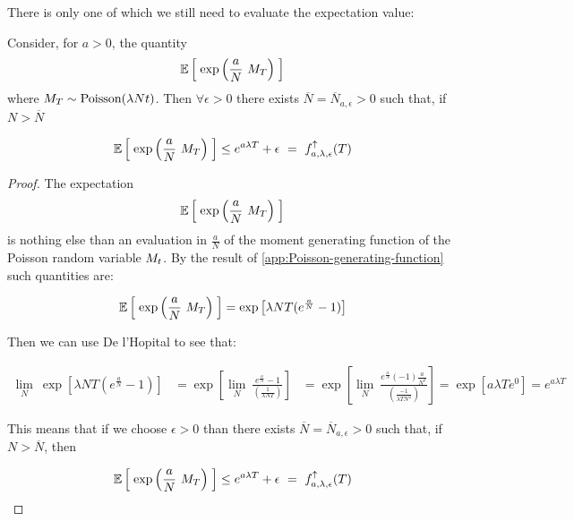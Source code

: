 There is only one \rv of which we still need to evaluate the expectation value:
	
\begin{lemma}\label{ch6:evaluate-moment-generating-func-in-lim-N}
	Consider, for $a>0$, the quantity
	\begin{equation*}
		\mathbb{E} \left[ \; 
			\exp \left(
			\frac{a}{N}\
			M_T
			\right) 
		 \; \right]
	\end{equation*}
	where $M_T \sim \text{Poisson}(\lambda N t)$.
	Then $\forall\epsilon > 0$ there exists $\overline{N}= \overline{N}_{a, \epsilon} >0$ such that, if $N > \overline{N}$
	
	\begin{equation*}
		\mathbb{E} \left[ \; 
			\exp \left(
			\frac{a}{N}\
			M_T
			\right)  \; \right] \leq e^{a\lambda T} + \epsilon\
			=\
			f^\uparrow_{a,\lambda,\epsilon}(T)
	\end{equation*}
\end{lemma}

\begin{proof}
	The expectation
	\begin{equation*}
		\mathbb{E} \left[ \; 
			\exp \left(
			\frac{a}{N}\
			M_T
			\right) 
		 \; \right]
	\end{equation*}
	is nothing else than an evaluation in $\frac{a}{N}$ of the moment generating function of the Poisson random variable $M_t$. 
	By the result of \ref{app:Poisson-generating-function} such quantities are:
	
	\begin{align*}
		\mathbb{E} \left[ \; 
			\exp \left(
			\frac{a}{N}\
			M_T
			\right)  \; \right]
		= \exp\left[\lambda N T (e^{\frac{a}{N}}-1)\right]
	\end{align*}
	
	Then we can use De l'Hopital to see that:
	
	\begin{align*}
		\lim_N\
		\exp\left[\lambda N T (e^{\frac{a}{N}}-1)\right]
		&=
		\exp\left[
		\lim_N\
		\frac{e^{\frac{a}{N}}-1}{
			\left(\frac{1}{\lambda N T } \right)}
		\right]
		&
		=
		\exp\left[
		\lim_N\
		\frac{e^{\frac{a}{N}}(-1)\frac{a}{N^2}}{
			\left(\frac{-1}{\lambda TN^2 } \right)}
		\right]	
		= \exp\left[
		a\lambda T e^0
		\right]	=e^{a\lambda T}
	\end{align*}
	
	This means that if we choose $\epsilon >0$ than there exists $\overline{N}= \overline{N}_{a, \epsilon} >0$ such that, if $N > \overline{N}$, then 
	
	\begin{equation*}
		\mathbb{E} \left[ \; 
			\exp \left(
			\frac{a}{N}\
			M_T
			\right)  \; \right] \leq e^{a\lambda T} + \epsilon\
			=\
			f^\uparrow_{a,\lambda,\epsilon}(T)
	\end{equation*}
\end{proof}

